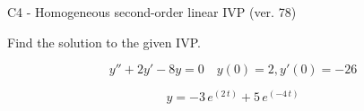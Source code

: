 \begin{exercise}
  \begin{exerciseTitle}C4 - Homogeneous second-order linear IVP (ver. 78)\end{exerciseTitle}
  \begin{exerciseStatement}
    
Find the solution to the given IVP.

    
\[y''+2y'-8y = 0 \hspace{1em} y(0) = 2 , y'(0) = -26\]

  \end{exerciseStatement}
  \begin{exerciseAnswer}
    
\[y= -3 \, e^{\left(2 \, t\right)} + 5 \, e^{\left(-4 \, t\right)}\]

  \end{exerciseAnswer}
\end{exercise}